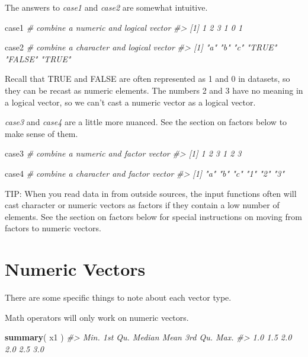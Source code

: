 \documentclass[]{book}
\newenvironment{Shaded}{\begin{snugshade}}{\end{snugshade}}
\newcommand{\CommentTok}[1]{\textcolor[rgb]{0.56,0.35,0.01}{\textit{#1}}}
\newcommand{\KeywordTok}[1]{\textcolor[rgb]{0.13,0.29,0.53}{\textbf{#1}}}
\newcommand{\NormalTok}[1]{#1}
\theoremstyle{definition}
\theoremstyle{definition}
\theoremstyle{definition}
\theoremstyle{remark}
\begin{document}
The answers to \emph{case1} and \emph{case2} are somewhat intuitive.

\begin{Shaded}
\begin{Highlighting}[]
\NormalTok{case1  }\CommentTok{# combine a numeric and logical vector}
\CommentTok{#> [1] 1 2 3 1 0 1}

\NormalTok{case2  }\CommentTok{# combine a character and logical vector}
\CommentTok{#> [1] "a"     "b"     "c"     "TRUE"  "FALSE" "TRUE"}
\end{Highlighting}
\end{Shaded}

Recall that TRUE and FALSE are often represented as 1 and 0 in datasets,
so they can be recast as numeric elements. The numbers 2 and 3 have no
meaning in a logical vector, so we can't cast a numeric vector as a
logical vector.

\emph{case3} and \emph{case4} are a little more nuanced. See the section
on factors below to make sense of them.

\begin{Shaded}
\begin{Highlighting}[]
\NormalTok{case3  }\CommentTok{# combine a numeric and factor vector}
\CommentTok{#> [1] 1 2 3 1 2 3}

\NormalTok{case4  }\CommentTok{# combine a character and factor vector}
\CommentTok{#> [1] "a" "b" "c" "1" "2" "3"}
\end{Highlighting}
\end{Shaded}

TIP: When you read data in from outside sources, the input functions
often will cast character or numeric vectors as factors if they contain
a low number of elements. See the section on factors below for special
instructions on moving from factors to numeric vectors.

\hypertarget{numeric-vectors}{%
\section{Numeric Vectors}\label{numeric-vectors}}

There are some specific things to note about each vector type.

Math operators will only work on numeric vectors.

\begin{Shaded}
\begin{Highlighting}[]

\KeywordTok{summary}\NormalTok{( x1 )}
\CommentTok{#>    Min. 1st Qu.  Median    Mean 3rd Qu.    Max. }
\CommentTok{#>     1.0     1.5     2.0     2.0     2.5     3.0}
\end{Highlighting}
\end{Shaded}
\end{document}
